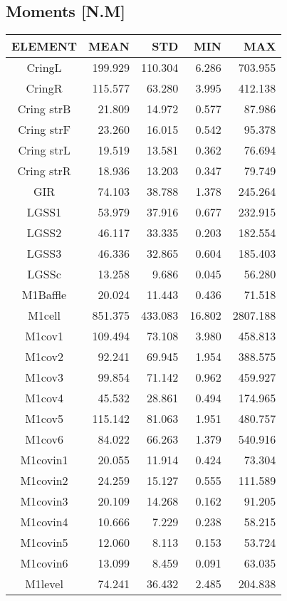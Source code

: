 \subsection{Moments [N.M]}
\begin{longtable}{crrrr}\toprule
 ELEMENT & MEAN & STD & MIN & MAX \\\hline
 CringL & 199.929 & 110.304 & 6.286 & 703.955 \\
 CringR & 115.577 & 63.280 & 3.995 & 412.138 \\
 Cring strB & 21.809 & 14.972 & 0.577 & 87.986 \\
 Cring strF & 23.260 & 16.015 & 0.542 & 95.378 \\
 Cring strL & 19.519 & 13.581 & 0.362 & 76.694 \\
 Cring strR & 18.936 & 13.203 & 0.347 & 79.749 \\
 GIR & 74.103 & 38.788 & 1.378 & 245.264 \\
 LGSS1 & 53.979 & 37.916 & 0.677 & 232.915 \\
 LGSS2 & 46.117 & 33.335 & 0.203 & 182.554 \\
 LGSS3 & 46.336 & 32.865 & 0.604 & 185.403 \\
 LGSSc & 13.258 & 9.686 & 0.045 & 56.280 \\
 M1Baffle & 20.024 & 11.443 & 0.436 & 71.518 \\
 M1cell & 851.375 & 433.083 & 16.802 & 2807.188 \\
 M1cov1 & 109.494 & 73.108 & 3.980 & 458.813 \\
 M1cov2 & 92.241 & 69.945 & 1.954 & 388.575 \\
 M1cov3 & 99.854 & 71.142 & 0.962 & 459.927 \\
 M1cov4 & 45.532 & 28.861 & 0.494 & 174.965 \\
 M1cov5 & 115.142 & 81.063 & 1.951 & 480.757 \\
 M1cov6 & 84.022 & 66.263 & 1.379 & 540.916 \\
 M1covin1 & 20.055 & 11.914 & 0.424 & 73.304 \\
 M1covin2 & 24.259 & 15.127 & 0.555 & 111.589 \\
 M1covin3 & 20.109 & 14.268 & 0.162 & 91.205 \\
 M1covin4 & 10.666 & 7.229 & 0.238 & 58.215 \\
 M1covin5 & 12.060 & 8.113 & 0.153 & 53.724 \\
 M1covin6 & 13.099 & 8.459 & 0.091 & 63.035 \\
 M1level & 74.241 & 36.432 & 2.485 & 204.838 \\

\end{longtable}
